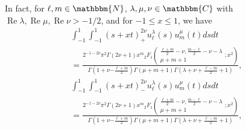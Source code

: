 \documentclass[12pt]{article}
\newcommand{\mybra}[1]{\left(#1\right)}
\numberwithin{equation}{section}
\newcommand{\tmop}[1]{\ensuremath{\operatorname{#1}}}
\begin{document}
\vspace{2em}
\begin{remark}
	In fact, 
  for $\ell, m \in \mathbbm{N}$,
  $\lambda, \mu, \nu \in \mathbbm{C}$ with $\tmop{Re} \lambda,
  \tmop{Re} \mu, \tmop{Re} \nu > - 1 / 2$, and for $- 1 \leqslant x \leqslant
  1$, we have
  \begin{multline}
     \displaystyle\int_{- 1}^1 \displaystyle\int_{- 1}^1 \mybra{ s + xt }_+^{2 \nu} u_{\ell}^{\lambda} (s)
    u_m^{\mu} (t) d s d t   \\
    \displaystyle= \frac{2^{-1-2\nu}\pi^2\Gamma(2\nu+1)
     x^m{}_2 F_1
    \left( \begin{array}{c}
      \frac{\ell + m}{2} - \nu, \frac{m - \ell}{2} - \nu - \lambda\\
      \mu + m + 1
    \end{array} ; x^2 \right)}{\Gamma\left( 1+\nu {-\frac{\ell+m}{2}}\right)\Gamma (\mu + m + 1) \Gamma \left( \lambda +
    \nu + \frac{\ell - m}{2} + 1 \right)},  \nonumber
  \end{multline}
  \begin{multline}
     \displaystyle\int_{- 1}^1 \displaystyle\int_{- 1}^1 \mybra{ s + xt }_-^{2 \nu} u_{\ell}^{\lambda} (s)
    u_m^{\mu} (t) d s d t   \\
    \displaystyle= \frac{2^{-1-2\nu}\pi^2\Gamma(2\nu+1)
     x^m{}_2 F_1
    \left( \begin{array}{c}
      \frac{\ell + m}{2} - \nu, \frac{m - \ell}{2} - \nu - \lambda\\
      \mu + m + 1
    \end{array} ; x^2 \right)}{\Gamma\left( 1+\nu {-\frac{\ell+m}{2}}\right)\Gamma (\mu + m + 1) \Gamma \left( \lambda +
    \nu + \frac{\ell - m}{2} + 1 \right)},  \nonumber
  \end{multline}
\end{remark}
\end{document}
